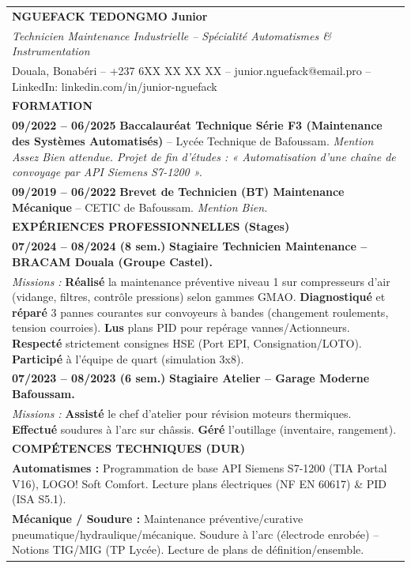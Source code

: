 \documentclass[11pt]{article}
\newcommand{\cle}[1]{{\popxbold\color{popdark}#1}}
\begin{document}
\begin{exoresolu}
\begin{center}
\begin{tabularx}{\linewidth}{|X|}\hline
\textbf{NGUEFACK TEDONGMO Junior} \\
\textit{Technicien Maintenance Industrielle -- Spécialité Automatismes \& Instrumentation} \\
Douala, Bonabéri -- +237 6XX XX XX XX -- junior.nguefack@email.pro -- \cle{LinkedIn: linkedin.com/in/junior-nguefack} \\
\hline
\textbf{\textcolor{popblue}{FORMATION}} \\
\textbf{09/2022 -- 06/2025} \textbf{Baccalauréat Technique Série F3 (Maintenance des Systèmes Automatisés)} -- Lycée Technique de Bafoussam. \textit{Mention Assez Bien attendue. Projet de fin d'études : « Automatisation d'une chaîne de convoyage par API Siemens S7-1200 ».} \\
\textbf{09/2019 -- 06/2022} \textbf{Brevet de Technicien (BT) Maintenance Mécanique} -- CETIC de Bafoussam. \textit{Mention Bien.} \\
\hline
\textbf{\textcolor{popblue}{EXPÉRIENCES PROFESSIONNELLES (Stages)}} \\
\textbf{07/2024 -- 08/2024 (8 sem.)} \textbf{Stagiaire Technicien Maintenance -- BRACAM Douala (Groupe Castel).} \\
\emph{Missions :} \textbf{Réalisé} la maintenance préventive niveau 1 sur compresseurs d'air (vidange, filtres, contrôle pressions) selon gammes GMAO. \textbf{Diagnostiqué} et \textbf{réparé} 3 pannes courantes sur convoyeurs à bandes (changement roulements, tension courroies). \textbf{Lus} plans PID pour repérage vannes/Actionneurs. \textbf{Respecté} strictement consignes HSE (Port EPI, Consignation/LOTO). \textbf{Participé} à l'équipe de quart (simulation 3x8). \\
\textbf{07/2023 -- 08/2023 (6 sem.)} \textbf{Stagiaire Atelier -- Garage Moderne Bafoussam.} \\
\emph{Missions :} \textbf{Assisté} le chef d'atelier pour révision moteurs thermiques. \textbf{Effectué} soudures à l'arc sur châssis. \textbf{Géré} l'outillage (inventaire, rangement). \\
\hline
\textbf{\textcolor{popblue}{COMPÉTENCES TECHNIQUES (DUR)}} \\
\textbf{Automatismes :} Programmation de base API Siemens S7-1200 (TIA Portal V16), LOGO! Soft Comfort. Lecture plans électriques (NF EN 60617) \& PID (ISA S5.1). \\
\textbf{Mécanique / Soudure :} Maintenance préventive/curative pneumatique/hydraulique/mécanique. Soudure à l'arc (électrode enrobée) -- Notions TIG/MIG (TP Lycée). Lecture de plans de définition/ensemble. \\

\end{tabularx}
\end{center}
\end{exoresolu}
\end{document}
